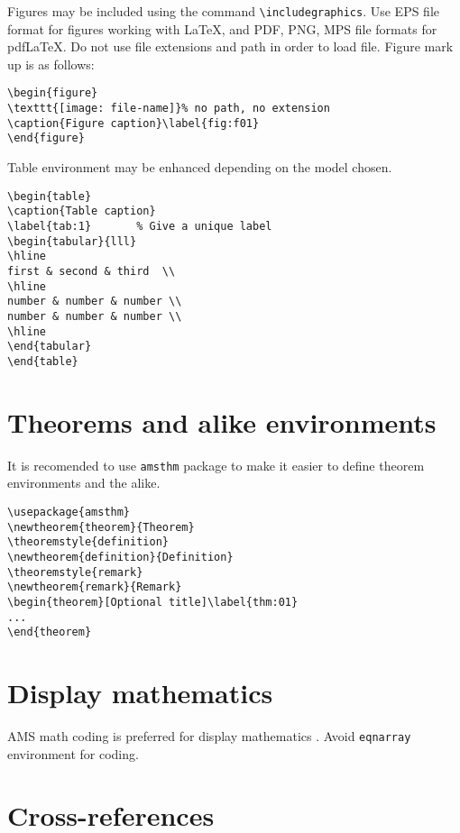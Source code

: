 \documentclass{ltxdoc}
\begin{document}
Figures may be included using the command \verb!\includegraphics!. 
Use EPS file format for figures  working with LaTeX, and PDF, PNG, MPS file formats for pdfLaTeX. 
Do not use file extensions and path in order to load file. Figure mark up is as follows:
\begin{Verbatim}
\begin{figure}
\texttt{[image: file-name]}% no path, no extension
\caption{Figure caption}\label{fig:f01}
\end{figure}
\end{Verbatim}
Table environment may be enhanced depending on the model chosen. 
\begin{Verbatim}
\begin{table}
\caption{Table caption}
\label{tab:1}       % Give a unique label
\begin{tabular}{lll}
\hline
first & second & third  \\
\hline
number & number & number \\
number & number & number \\
\hline
\end{tabular}
\end{table}
\end{Verbatim}


\section{Theorems and alike environments}

It is recomended to use \verb!amsthm! package \cite{ref:amsthm} to make it easier 
to define theorem environments and the alike.
\begin{Verbatim}
\usepackage{amsthm}
\newtheorem{theorem}{Theorem}
\theoremstyle{definition}
\newtheorem{definition}{Definition}
\theoremstyle{remark}
\newtheorem{remark}{Remark}
\begin{theorem}[Optional title]\label{thm:01}
...
\end{theorem}
\end{Verbatim}


\section{Display mathematics}

AMS math coding is preferred for display mathematics \cite{ref:amsmath}.
Avoid \verb!eqnarray! environment for coding.


\section{Cross-references}
\end{document}
